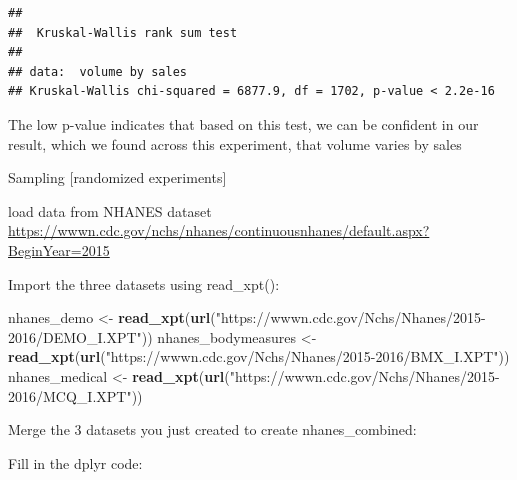 \documentclass[]{book}
\newenvironment{Shaded}{\begin{snugshade}}{\end{snugshade}}
\newcommand{\ControlFlowTok}[1]{\textcolor[rgb]{0.13,0.29,0.53}{\textbf{#1}}}
\newcommand{\DataTypeTok}[1]{\textcolor[rgb]{0.13,0.29,0.53}{#1}}
\newcommand{\KeywordTok}[1]{\textcolor[rgb]{0.13,0.29,0.53}{\textbf{#1}}}
\newcommand{\NormalTok}[1]{#1}
\newcommand{\OperatorTok}[1]{\textcolor[rgb]{0.81,0.36,0.00}{\textbf{#1}}}
\newcommand{\OtherTok}[1]{\textcolor[rgb]{0.56,0.35,0.01}{#1}}
\newcommand{\StringTok}[1]{\textcolor[rgb]{0.31,0.60,0.02}{#1}}
\begin{document}
\begin{verbatim}
## 
## 	Kruskal-Wallis rank sum test
## 
## data:  volume by sales
## Kruskal-Wallis chi-squared = 6877.9, df = 1702, p-value < 2.2e-16
\end{verbatim}

The low p-value indicates that based on this test, we can be confident in our result, which we found across this experiment, that volume varies by sales

Sampling {[}randomized experiments{]}

load data from NHANES dataset
\url{https://wwwn.cdc.gov/nchs/nhanes/continuousnhanes/default.aspx?BeginYear=2015}

Import the three datasets using read\_xpt():

\begin{Shaded}
\begin{Highlighting}[]
\NormalTok{nhanes_demo <-}\StringTok{ }\KeywordTok{read_xpt}\NormalTok{(}\KeywordTok{url}\NormalTok{(}\StringTok{"https://wwwn.cdc.gov/Nchs/Nhanes/2015-2016/DEMO_I.XPT"}\NormalTok{))}
\NormalTok{nhanes_bodymeasures <-}\StringTok{ }\KeywordTok{read_xpt}\NormalTok{(}\KeywordTok{url}\NormalTok{(}\StringTok{"https://wwwn.cdc.gov/Nchs/Nhanes/2015-2016/BMX_I.XPT"}\NormalTok{))}
\NormalTok{nhanes_medical <-}\StringTok{ }\KeywordTok{read_xpt}\NormalTok{(}\KeywordTok{url}\NormalTok{(}\StringTok{"https://wwwn.cdc.gov/Nchs/Nhanes/2015-2016/MCQ_I.XPT"}\NormalTok{))}
\end{Highlighting}
\end{Shaded}

Merge the 3 datasets you just created to create nhanes\_combined:

\begin{Shaded}
\end{Shaded}

Fill in the dplyr code:

\begin{Shaded}
\end{Shaded}
\end{document}
